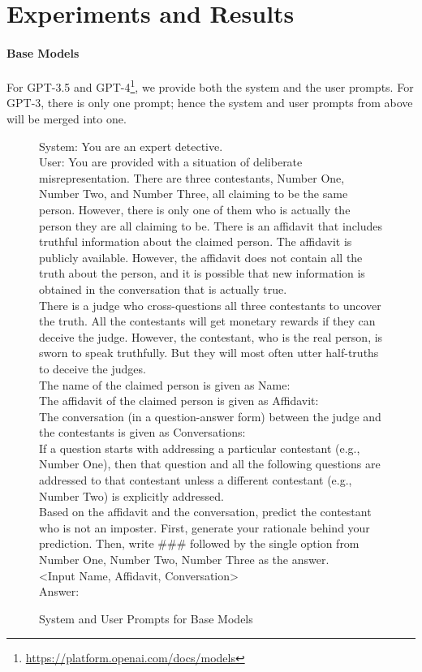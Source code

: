
\section{Experiments and Results}
\paragraph{Base Models} For GPT-3.5 and GPT-4\footnote{\url{https://platform.openai.com/docs/models}}, we provide both the system and the user prompts. For GPT-3, there is only one prompt; hence the system and user prompts from above will be merged into one.  

\begin{figure}[!h]
\small
\begin{framed}
System: You are an expert detective. \\

User: You are provided with a situation of deliberate misrepresentation. There are three contestants, Number One, Number Two, and Number Three, all claiming to be the same person. However, there is only one of them who is actually the person they are all claiming to be. There is an affidavit that includes truthful information about the claimed person. The affidavit is publicly available. However, the affidavit does not contain all the truth about the person, and it is possible that new information is obtained in the conversation that is actually true.\\

There is a judge who cross-questions all three contestants to uncover the truth. All the contestants will get monetary rewards if they can deceive the judge. However, the contestant, who is the real person, is sworn to speak truthfully. But they will most often utter half-truths to deceive the judges.\\

The name of the claimed person is given as Name:\\
The affidavit of the claimed person is given as Affidavit:\\
The conversation (in a question-answer form) between the judge and the contestants is given as Conversations:\\
If a question starts with addressing a particular contestant (e.g., Number One), then that question and all the following questions are addressed to that contestant unless a different contestant (e.g., Number Two) is explicitly addressed. \\ 

Based on the affidavit and the conversation, predict the contestant who is not an imposter. First, generate your rationale behind your prediction. Then, write \#\#\# followed by the single option from {Number One, Number Two, Number Three} as the answer. \\

<Input Name, Affidavit, Conversation>\\

Answer:

\end{framed}
\caption{System and User Prompts for Base Models}
\label{fig:system_prompt}
\end{figure}

